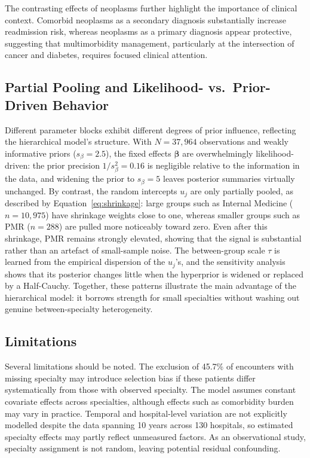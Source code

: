 \documentclass[10pt]{article}
\newcommand{\bbeta}{\bm{\beta}}
\begin{document}
The contrasting effects of neoplasms further highlight the importance of clinical context. Comorbid neoplasms as a secondary diagnosis substantially increase readmission risk, whereas neoplasms as a primary diagnosis appear protective, suggesting that multimorbidity management, particularly at the intersection of cancer and diabetes, requires focused clinical attention.


\subsection{Partial Pooling and Likelihood- vs.\ Prior-Driven Behavior}

Different parameter blocks exhibit different degrees of prior influence,
reflecting the hierarchical model's structure. With $N = 37{,}964$
observations and weakly informative priors ($s_\beta = 2.5$), the fixed
effects $\bbeta$ are overwhelmingly likelihood-driven: the prior precision
$1/s_\beta^2 = 0.16$ is negligible relative to the information in the data,
and widening the prior to $s_\beta = 5$ leaves posterior summaries virtually
unchanged. By contrast, the random intercepts $u_j$ are only partially pooled,
as described by Equation~\eqref{eq:shrinkage}: large groups such as Internal
Medicine ($n = 10{,}975$) have shrinkage weights close to one, whereas smaller
groups such as PMR ($n = 288$) are pulled more noticeably toward zero. Even
after this shrinkage, PMR remains strongly elevated, showing that the signal is
substantial rather than an artefact of small-sample noise. The between-group
scale $\tau$ is learned from the empirical dispersion of the $u_j$'s, and the
sensitivity analysis shows that its posterior changes little when the
hyperprior is widened or replaced by a Half-Cauchy. Together, these patterns
illustrate the main advantage of the hierarchical model: it borrows strength
for small specialties without washing out genuine between-specialty
heterogeneity.

\subsection{Limitations}

Several limitations should be noted. The exclusion of 45.7\% of encounters with missing specialty may introduce selection bias if these patients differ systematically from those with observed specialty. The model assumes constant covariate effects across specialties, although effects such as comorbidity burden may vary in practice. Temporal and hospital-level variation are not explicitly modelled despite the data spanning 10 years across 130 hospitals, so estimated specialty effects may partly reflect unmeasured factors. As an observational study, specialty assignment is not random, leaving potential residual confounding. 
\end{document}
